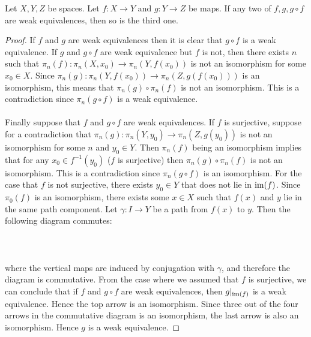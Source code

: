 \begin{prp}\label{prp:2o3} Let $X,Y,Z$ be spaces. Let $f:X\to Y$ and $g:Y\to Z$ be maps. If any two of $f,g,g\circ f$ are weak equivalences, then so is the third one. 
\begin{proof}
If $f$ and $g$ are weak equivalences then it is clear that $g\circ f$ is a weak equivalence. If $g$ and $g\circ f$ are weak equivalence but $f$ is not, then there exists $n$ such that $\pi_n(f):\pi_n(X,x_0)\to\pi_n(Y,f(x_0))$ is not an isomorphism for some $x_0\in X$. Since $\pi_n(g):\pi_n(Y,f(x_0))\to\pi_n(Z,g(f(x_0)))$ is an isomorphism, this means that $\pi_n(g)\circ\pi_n(f)$ is not an isomorphism. This is a contradiction since $\pi_n(g\circ f)$ is a weak equivalence. \\~\\

Finally suppose that $f$ and $g\circ f$ are weak equivalences. If $f$ is surjective, suppose for a contradiction that $\pi_n(g):\pi_n(Y,y_0)\to\pi_n(Z,g(y_0))$ is not an isomorphism for some $n$ and $y_0\in Y$. Then $\pi_n(f)$ being an isomorphism implies that for any $x_0\in f^{-1}(y_0)$ ($f$ is surjective) then $\pi_n(g)\circ\pi_n(f)$ is not an isomorphism. This is a contradiction since $\pi_n(g\circ f)$ is an isomorphism. For the case that $f$ is not surjective, there exists $y_0\in Y$ that does not lie in $\operatorname{im}(f)$. Since $\pi_0(f)$ is an isomorphism, there exists some $x\in X$ such that $f(x)$ and $y$ lie in the same path component. Let $\gamma:I\to Y$ be a path from $f(x)$ to $y$. Then the following diagram commutes: \\~\\
\\~\\
where the vertical maps are induced by conjugation with $\gamma$, and therefore the diagram is commutative. From the case where we assumed that $f$ is surjective, we can conclude that if $f$ and $g\circ f$ are weak equivalences, then $g|_{\operatorname{im}(f)}$ is a weak equivalence. Hence the top arrow is an isomorphism. Since three out of the four arrows in the commutative diagram is an isomorphism, the last arrow is also an isomorphism. Hence $g$ is a weak equivalence. 
\end{proof}
\end{prp}

